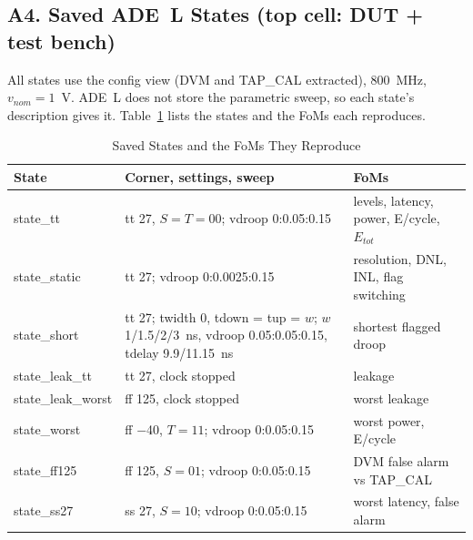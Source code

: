 \documentclass[conference]{IEEEtran}
\begin{document}
\subsection*{A4. Saved ADE~L States (top cell: DUT + test bench)}
All states use the config view (DVM and TAP\_CAL extracted), 800~MHz, $v_{nom}=1$~V. ADE~L does not store the parametric sweep, so each state's description gives it. Table~\ref{tab:states} lists the states and the FoMs each reproduces.

\begin{table}[!h]
\caption{Saved States and the FoMs They Reproduce}
\label{tab:states}
\centering\footnotesize
\setlength{\tabcolsep}{2pt}
\begin{tabular}{>{\raggedright\arraybackslash}p{}>{\raggedright\arraybackslash}p{}>{\raggedright\arraybackslash}p{}}
\toprule
State & Corner, settings, sweep & FoMs \\
\midrule
state\_tt & tt 27, $S{=}T{=}00$; vdroop 0:0.05:0.15 & levels, latency, power, E/cycle, $E_{tot}$ \\
state\_static & tt 27; vdroop 0:0.0025:0.15 & resolution, DNL, INL, flag switching \\
state\_short & tt 27; twidth 0, tdown = tup = $w$; $w$ 1/1.5/2/3~ns, vdroop 0.05:0.05:0.15, tdelay 9.9/11.15~ns & shortest flagged droop \\
state\_leak\_tt & tt 27, clock stopped & leakage \\
state\_leak\_worst & ff 125, clock stopped & worst leakage \\
state\_worst & ff $-$40, $T{=}11$; vdroop 0:0.05:0.15 & worst power, E/cycle \\
state\_ff125 & ff 125, $S{=}01$; vdroop 0:0.05:0.15 & DVM false alarm vs TAP\_CAL \\
state\_ss27 & ss 27, $S{=}10$; vdroop 0:0.05:0.15 & worst latency, false alarm \\
\bottomrule
\end{tabular}
\end{table}
\end{document}
